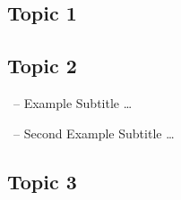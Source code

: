 \subsection{Topic 1}
\begin{frame}{\insertsubsection}
	\begin{mycolumns}
		\todots
	\mynextcolumn
		\todots
	\end{mycolumns}
\end{frame}

\subsection{Topic 2}
\begin{frame}{\insertsubsection\ -- Example Subtitle}
	\ldots
\end{frame}

\begin{frame}{\insertsubsection\ -- Second Example Subtitle}
	\ldots
\end{frame}

\subsection{Topic 3}


